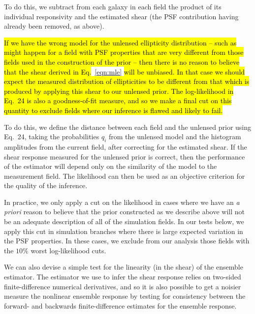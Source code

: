\documentclass[iop]{emulateapj}
\newcommand\rmcomment[1]{\textcolor{red}{(RM: #1)}}
\begin{document}
To do this, we subtract from each galaxy in each field the product of
its individual responsivity and the estimated shear (the PSF
contribution having already been removed, as above).


\hl{If we have the wrong model for the unlensed ellipticity distribution
-- such as might happen for a field with PSF properties that are very
different from those fields used in the construction of the prior --
then there is no reason to believe that the shear derived in
Eq.}~\ref{eqn:mle} \hl{will be unbiased. In that case we should expect the
measured distribution of ellipticities to be different from that which
is produced by applying this shear to our unlensed prior. The
log-likelihood in Eq.~24 is also a goodness-of-fit measure, and so we
make a final cut on this quantity to exclude fields where our inference
is flawed and likely to fail.}


To do this, we define the distance between each field and the unlensed
prior using Eq.~24, taking the probabilities $q_i$ from the unlensed
model and the histogram amplitudes from the current field, after
correcting for the estimated shear. If the shear response measured for
the unlensed prior is correct, then the performance of the estimator
will depend only on the similarity of the model to the measurement
field. The likelihood can then be used as an objective criterion for
the quality of the inference.

In practice, we only apply a cut on the likelihood in cases where we
have an {\it a priori} reason to believe that the prior constructed as
we describe above will not be an adequate description of all of the
simulation fields. In our tests below, we apply this cut in simulation
branches where there is large expected variation in the PSF
properties. In these cases, we exclude from our analysis those fields
with the $10\%$ worst log-likelihood cuts.



We can also devise a simple test for the linearity (in the shear) of
the ensemble estimator. The estimator we use to infer the shear
response relies on two-sided finite-difference numerical derivatives,
and so it is also possible to get a noisier measure the nonlinear
ensemble response by testing for consistency between the forward- and
backwards finite-difference estimates for the ensemble response. 
\end{document}

